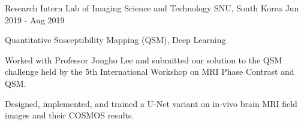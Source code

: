 \begin{cventries}
  \cventry
    {Research Intern} %
    {Lab of Imaging Science and Technology} %
    {SNU, South Korea} %
    {Jun 2019 - Aug 2019} %
    {
      \begin{cvitems} %
        \item {Quantitative Susceptibility Mapping (QSM), Deep Learning}
        \item {Worked with Professor Jongho Lee and submitted our solution to the QSM challenge held by the 5th International Workshop on MRI Phase Contrast and QSM.}
        \item {Designed, implemented, and trained a U-Net variant on in-vivo brain MRI field images and their COSMOS results.}
      \end{cvitems}
    }

\end{cventries}

